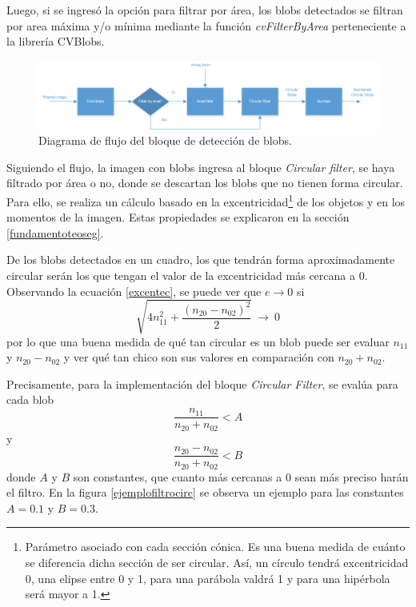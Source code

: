 Luego, si se ingresó la opción para filtrar por área, los blobs\cite{defBlob} detectados se filtran por area máxima y/o mínima mediante la función \emph{cvFilterByArea} perteneciente a la librería CVBlobs\cite{cvblob}. 

\begin{figure}[H]
\begin{center}
\includegraphics[scale=0.7]{img/detectBlobs_diagrama.png}
\end{center}
\caption{Diagrama de flujo del bloque de detección de blobs.}
\label{diagramadetectblobs}
\end{figure}

Siguiendo el flujo, la imagen con blobs ingresa al bloque \emph{Circular filter}, se haya filtrado por área o no, donde se descartan los blobs que no tienen forma circular. Para ello, se realiza un cálculo basado en la excentricidad\footnote{Parámetro asociado con cada sección cónica. Es una buena medida de cuánto se diferencia dicha sección de ser circular. Así, un círculo tendrá excentricidad 0, una elipse entre 0 y 1, para una parábola valdrá 1 y para una hipérbola será mayor a 1\cite{excentricidad}. } de los objetos y en los momentos de la imagen. Estas propiedades se explicaron en la sección \ref{fundamentoteoseg}.

De los blobs detectados en un cuadro, los que tendrán forma aproximadamente circular serán los que tengan el valor de la excentricidad más cercana a $0$. Observando la ecuación \ref{excentec}, se puede ver que $e{\rightarrow}0$ si $$\sqrt{4n_{11}^2+\frac{(n_{20}-n_{02})^2}{2}}\ {\rightarrow}\ 0$$ por lo que una buena medida de qué tan circular es un blob puede ser evaluar $n_{11}$ y $n_{20}-n_{02}$ y ver qué tan chico son sus valores en comparación con $n_{20}+n_{02}$.

Precisamente, para la implementación del bloque \emph{Circular Filter}, se evalúa para cada blob $$\frac{n_{11}}{n_{20}+n_{02}}< A$$ y $$\frac{n_{20}-n_{02}}{n_{20}+n_{02}}< B$$ donde $A$ y $B$ son constantes, que cuanto más cercanas a $0$ sean más preciso harán el filtro. En la figura \ref{ejemplofiltrocirc} se observa un ejemplo para las constantes $A = 0.1$ y $B = 0.3$.

